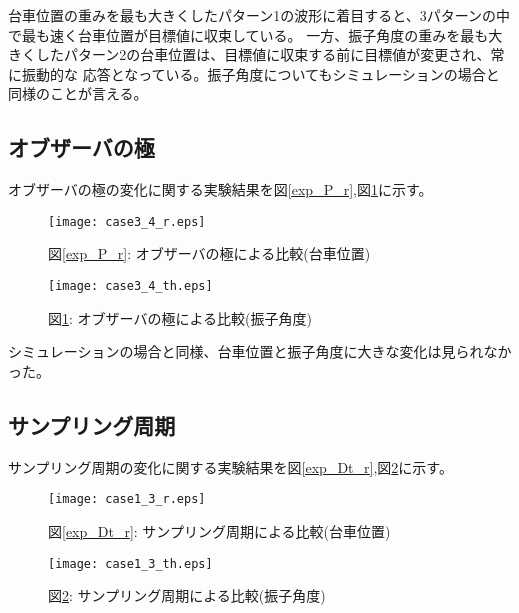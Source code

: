 台車位置の重みを最も大きくしたパターン1の波形に着目すると、3パターンの中で最も速く台車位置が目標値に収束している。
一方、振子角度の重みを最も大きくしたパターン2の台車位置は、目標値に収束する前に目標値が変更され、常に振動的な
応答となっている。振子角度についてもシミュレーションの場合と同様のことが言える。


\subsection{オブザーバの極}
オブザーバの極の変化に関する実験結果を図\ref{exp_P_r},図\ref{exp_P_th}に示す。

\begin{figure}[htbp]
    \begin{minipage}{0.5\hsize}
        \begin{center}
            \texttt{[image: case3\_4\_r.eps]}
            \caption{図\ref{exp_P_r}: オブザーバの極による比較(台車位置)}
            \label{exp_P_r}
        \end{center}
    \end{minipage}
    \begin{minipage}{0.5\hsize}
        \begin{center}
            \texttt{[image: case3\_4\_th.eps]}
            \caption{図\ref{exp_P_th}: オブザーバの極による比較(振子角度)}
            \label{exp_P_th}
        \end{center}
    \end{minipage}
\end{figure}

シミュレーションの場合と同様、台車位置と振子角度に大きな変化は見られなかった。


\subsection{サンプリング周期}
サンプリング周期の変化に関する実験結果を図\ref{exp_Dt_r},図\ref{exp_Dt_th}に示す。

\begin{figure}[htbp]
    \begin{minipage}{0.5\hsize}
        \begin{center}
            \texttt{[image: case1\_3\_r.eps]}
            \caption{図\ref{exp_Dt_r}: サンプリング周期による比較(台車位置)}
            \label{exp_Dt_r}
        \end{center}
    \end{minipage}
    \begin{minipage}{0.5\hsize}
        \begin{center}
            \texttt{[image: case1\_3\_th.eps]}
            \caption{図\ref{exp_Dt_th}: サンプリング周期による比較(振子角度)}
            \label{exp_Dt_th}
        \end{center}
    \end{minipage}
\end{figure}

